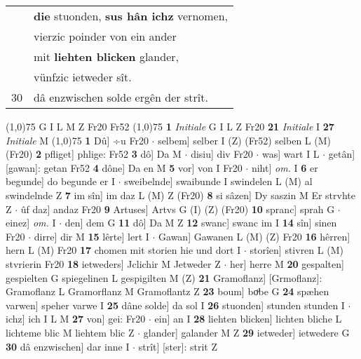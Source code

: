\documentclass[8pt,a4paper,notitlepage]{article}
\begin{document}
\begin{table}[ht]
\begin{minipage}[t]{0.5\linewidth}
\begin{tabular}{rl}
 & \textbf{die} stuonden, \textbf{sus hân ichz} vernomen,\\ 
 & vierzic poinder von ein ander\\ 
 & mit \textbf{liehten blicken} glander,\\ 
 & vünfzic ietweder sît.\\ 
30 & dâ enzwischen solde ergên der strît.\\ 
\end{tabular}
\scriptsize
\line(1,0){75} \newline
G I L M Z Fr20 Fr52 \newline
\line(1,0){75} \newline
\textbf{1} \textit{Initiale} G I L Z Fr20  \textbf{21} \textit{Initiale} I  \textbf{27} \textit{Initiale} M  \newline
\line(1,0){75} \newline
\textbf{1} Dû] ÷u Fr20  $\cdot$ selbem] selber I (Z) (Fr52) selben L (M) (Fr20) \textbf{2} pfliget] phlige: Fr52 \textbf{3} dô] Da M  $\cdot$ disiu] div Fr20  $\cdot$ was] wart I L  $\cdot$ getân] [gawan]: getan Fr52 \textbf{4} dône] Da en M \textbf{5} vor] von I Fr20  $\cdot$ niht] \textit{om.} I \textbf{6} er begunde] do begunde er I  $\cdot$ sweibelnde] swaibunde I swindelen L (M) al swindelnde Z \textbf{7} im sîn] im daz L (M) Z (Fr20) \textbf{8} si sâzen] Dy saszin M Er strvhte Z  $\cdot$ ûf daz] andaz Fr20 \textbf{9} Artuses] Artvs G (I) (Z) (Fr20) \textbf{10} spranc] sprah G  $\cdot$ einez] \textit{om.} I  $\cdot$ den] dem G \textbf{11} dô] Da M Z \textbf{12} swanc] swanc im I \textbf{14} sîn] sinen Fr20  $\cdot$ dirre] dir M \textbf{15} lêrte] lert I  $\cdot$ Gawan] Gawanen L (M) (Z) Fr20 \textbf{16} hêrren] hern L (M) Fr20 \textbf{17} chomen mit storien hie und dort I  $\cdot$ storîen] stivren L (M) stvrierin Fr20 \textbf{18} ietweders] Jclichir M Jetweder Z  $\cdot$ her] herre M \textbf{20} gespalten] gespielten G spiegelinen L gespigilten M (Z) \textbf{21} Gramoflanz] [Grmoflanz]: Gramoflanz L Gramorflanz M Gramoflantz Z \textbf{23} boum] boͮbe G \textbf{24} spæhen varwen] speher varwe I \textbf{25} dâne solde] da sol I \textbf{26} stuonden] stunden stunden I  $\cdot$ ichz] ich I L M \textbf{27} von] gei: Fr20  $\cdot$ ein] an I \textbf{28} liehten blicken] lichten bliche L lichteme blic M liehtem blic Z  $\cdot$ glander] galander M Z \textbf{29} ietweder] ietwedere G \textbf{30} dâ enzwischen] dar inne I  $\cdot$ strît] [ster]: strit Z \newline
\end{minipage}
\hspace{0.5cm}

\end{table}
\end{document}
